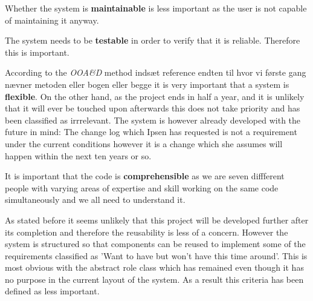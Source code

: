 Whether the system is \textbf{maintainable} is less important as the user is not capable of maintaining it anyway.

The system needs to be \textbf{testable} in order to verify that it is reliable. Therefore this is important.

According to the \textit{OOA\&D} method {\color{red}indsæt reference endten til hvor vi første gang nævner metoden eller bogen eller begge} it is very important that a system is \textbf{flexible}.
On the other hand, as the project ends in half a year, and it is unlikely that it will ever be touched upon afterwards this does not take priority and has been classified as irrrelevant.
The system is however already developed with the future in mind: The change log which Ipsen has requested is not a requirement under the current conditions however it is a change which she assumes will happen within the next ten years or so.

It is important that the code is \textbf{comprehensible} as we are seven diffferent people with varying areas of expertise and skill working on the same code simultaneously and we all need to understand it.

As stated before it seems unlikely that this project will be developed further after its completion and therefore the reusability is less of a concern.
However the system is structured so that components can be reused to implement some of the requirements classified as 'Want to have but won't have this time around'.
This is most obvious with the abstract role class which has remained even though it has no purpose in the current layout of the system.
As a result this criteria has been defined as less important.

